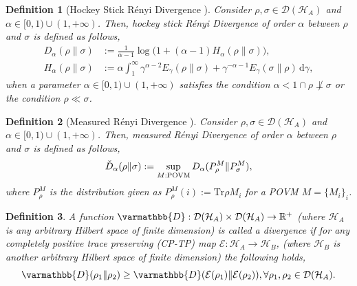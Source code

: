 \documentclass[onecolumn,ldraftcls, 11pt]{IEEEtran}
\newcommand{\tr}{\mathrm{Tr}}
\newcommand*{\bbR}{\mathbb{R}}
\newcommand*{\cH}{\mathcal{H}}
\newcommand*{\cD}{\mathcal{D}}
\newcommand*{\cE}{\mathcal{E}}
\newtheorem{definition}{Definition}
\begin{document}
\begin{definition}[Hockey Stick R\'enyi Divergence {\cite{Hirche_2024}}]\label{def_quant_renyi_hockey}
    Consider $\rho,\sigma \in \cD(\cH_A)$ and $\alpha \in [0,1) \cup (1,+\infty)$. Then, hockey stick R\'enyi Divergence of order $\alpha$ between $\rho$ and $\sigma$ is defined as follows,
        \begin{align}
    D_\alpha(\rho \| \sigma) &:= \frac{1}{\alpha - 1} \log \big( 1 + (\alpha - 1) H_\alpha(\rho \| \sigma) \big),
\label{def_P_div_integral_rep_eq} \\
H_\alpha(\rho \| \sigma) &:= \alpha \int_{1}^{\infty} \gamma^{\alpha - 2} E_\gamma(\rho \| \sigma) + \gamma^{-\alpha - 1} E_\gamma(\sigma \| \rho) \, \mathrm{d}\gamma,
    \end{align}
when a parameter $\alpha \in [0,1) \cup (1,+\infty)$
satisfies the condition
$\alpha < 1 \cap \rho \not\perp \sigma$ or the condition $\rho \ll \sigma$.
\end{definition}

\begin{definition}[Measured R\'enyi Divergence {\cite{H2017QIT,Hirche_2024}}]\label{def_sand}
    Consider $\rho,\sigma \in \cD(\cH_A)$ and $\alpha \in [0,1) \cup (1,+\infty)$. Then, measured R\'enyi Divergence of order $\alpha$ between $\rho$ and $\sigma$ is defined as follows,
    \begin{align*}
        \check{D}_{\alpha} (\rho \| \sigma) 
:= \sup_{M: {\rm POVM}}D_\alpha(P^M_\rho\|P^M_\sigma),
    \end{align*}
    where $P^M_\rho$ is the distribution given as
    $P^M_\rho(i):= \tr \rho M_i$ for a POVM $M=\{M_i\}_i$.    
\end{definition}


\begin{definition}\label{def_data_proc_func}
    A function $\varmathbb{D} : \cD(\cH_A) \times \cD(\cH_A) \to \bbR^{+}$ (where $\cH_A$ is any arbitrary Hilbert space of finite dimension) is called a divergence if for  
    any completely positive trace preserving (CP-TP) map $\cE: \cH_A \to \cH_B$, (where $\cH_B$ is another arbitrary Hilbert space of finite dimension) the following holds,
    \begin{equation}
       \varmathbb{D}(\rho_1\|\rho_2) \geq  \varmathbb{D}(\cE(\rho_1)\|\cE(\rho_2)), \forall \rho_1,\rho_2 \in \cD(\cH_A).\label{def_data_proc_quantum_div_eq}
    \end{equation}
\end{definition}
\end{document}
